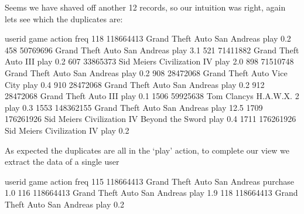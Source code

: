\documentclass[letterpaper,10pt,english]{jupyterBook}
\begin{document}
\sphinxAtStartPar
Seems we have shaved off another 12 records, so our intuition was right, again lets see which the duplicates are:

\begin{sphinxVerbatim}[commandchars=\\\{\}]
\PYG{p}{[}\PYG{p}{[}  \PYG{p}{]}\PYG{p}{]}
\end{sphinxVerbatim}

\begin{sphinxVerbatim}[commandchars=\\\{\}]
        user\PYGZus{}id                                          game action  freq
118   118664413                  Grand Theft Auto San Andreas   play   0.2
458    50769696                  Grand Theft Auto San Andreas   play   3.1
521    71411882                          Grand Theft Auto III   play   0.2
607    33865373                   Sid Meier\PYGZsq{}s Civilization IV   play   2.0
898    71510748                  Grand Theft Auto San Andreas   play   0.2
908    28472068                    Grand Theft Auto Vice City   play   0.4
910    28472068                  Grand Theft Auto San Andreas   play   0.2
912    28472068                          Grand Theft Auto III   play   0.1
1506   59925638                       Tom Clancy\PYGZsq{}s H.A.W.X. 2   play   0.3
1553  148362155                  Grand Theft Auto San Andreas   play  12.5
1709  176261926  Sid Meier\PYGZsq{}s Civilization IV Beyond the Sword   play   0.4
1711  176261926                   Sid Meier\PYGZsq{}s Civilization IV   play   0.2
\end{sphinxVerbatim}

\sphinxAtStartPar
As expected the duplicates are all in the ‘play’ action, to complete our view we extract the data of a single user

\begin{sphinxVerbatim}[commandchars=\\\{\}]
\PYG{p}{[}\PYG{p}{]}
\end{sphinxVerbatim}

\begin{sphinxVerbatim}[commandchars=\\\{\}]
       user\PYGZus{}id                          game    action  freq
115  118664413  Grand Theft Auto San Andreas  purchase   1.0
116  118664413  Grand Theft Auto San Andreas      play   1.9
118  118664413  Grand Theft Auto San Andreas      play   0.2
\end{sphinxVerbatim}
\end{document}

